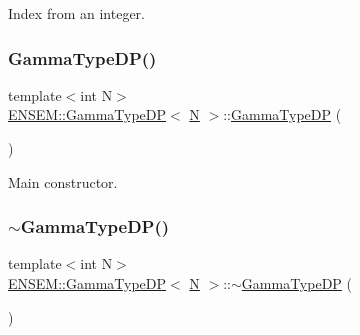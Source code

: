 Index from an integer. 

\mbox{\label{classENSEM_1_1GammaTypeDP_a1833bb262c5e172a0463d853c76c1d18}} 
\subsubsection{\texorpdfstring{GammaTypeDP()}{GammaTypeDP()}\hspace{0.1cm}{\footnotesize\ttfamily [3/4]}}
{\footnotesize\ttfamily template$<$int N$>$ \\
\mbox{\hyperlink{classENSEM_1_1GammaTypeDP}{E\+N\+S\+E\+M\+::\+Gamma\+Type\+DP}}$<$ \mbox{\hyperlink{operator__name__util_8cc_a7722c8ecbb62d99aee7ce68b1752f337}{N}} $>$\+::\mbox{\hyperlink{classENSEM_1_1GammaTypeDP}{Gamma\+Type\+DP}} (\begin{DoxyParamCaption}{ }\end{DoxyParamCaption})\hspace{0.3cm}{\ttfamily [inline]}}



Main constructor. 

\mbox{\label{classENSEM_1_1GammaTypeDP_ad0e6f055b87687dac9b7b95e6ec808b0}} 
\subsubsection{\texorpdfstring{$\sim$GammaTypeDP()}{~GammaTypeDP()}\hspace{0.1cm}{\footnotesize\ttfamily [2/2]}}
{\footnotesize\ttfamily template$<$int N$>$ \\
\mbox{\hyperlink{classENSEM_1_1GammaTypeDP}{E\+N\+S\+E\+M\+::\+Gamma\+Type\+DP}}$<$ \mbox{\hyperlink{operator__name__util_8cc_a7722c8ecbb62d99aee7ce68b1752f337}{N}} $>$\+::$\sim$\mbox{\hyperlink{classENSEM_1_1GammaTypeDP}{Gamma\+Type\+DP}} (\begin{DoxyParamCaption}{ }\end{DoxyParamCaption})\hspace{0.3cm}{\ttfamily [inline]}}



